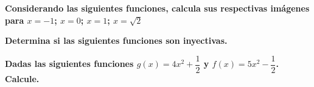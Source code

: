 \documentclass[12pt, addpoints, answers]{exam}
\begin{document}
	
	
	
	
	\vspace{1 cm}
	
	\begin{questions}
	\question[1] \textbf{	Considerando las siguientes funciones, calcula sus respectivas imágenes para $x = -1$; $x = 0 $; $x = 1 $; $x =\sqrt{2}$ }
		\question[1] \textbf{Determina si las siguientes funciones son inyectivas.}
\question[1] \textbf{Dadas las siguientes funciones $g(x)=4x^{2}+\dfrac{1}{2}$  y   $f(x)=5x^{2}-\dfrac{1}{2}$. Calcule.}
 \begin{parts}

\end{parts}
\end{questions}
\end{document}
